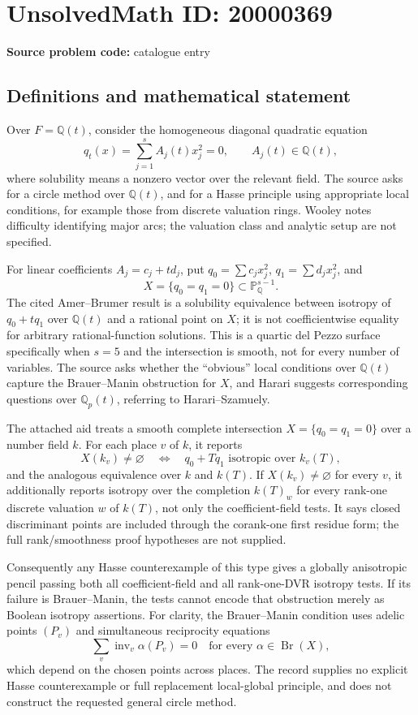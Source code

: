 \documentclass[11pt]{article}
\newcommand{\Q}{\mathbb{Q}}
\newcommand{\PP}{\mathbb{P}}
\begin{document}
\section*{UnsolvedMath ID: 20000369}
\textbf{Source problem code:} catalogue entry
\subsection{Definitions and mathematical statement}
Over \(F=\Q(t)\), consider the homogeneous diagonal quadratic equation
\[
q_t(x)=\sum_{j=1}^s A_j(t)x_j^2=0,\qquad A_j(t)\in\Q(t),
\]
where solubility means a nonzero vector over the relevant field. The source asks for a circle method over \(\Q(t)\), and for a Hasse principle using appropriate local conditions, for example those from discrete valuation rings. Wooley notes difficulty identifying major arcs; the valuation class and analytic setup are not specified.

For linear coefficients \(A_j=c_j+td_j\), put \(q_0=\sum c_jx_j^2\), \(q_1=\sum d_jx_j^2\), and
\[
X=\{q_0=q_1=0\}\subset\PP^{s-1}_{\Q}.
\]
The cited Amer--Brumer result is a solubility equivalence between isotropy of \(q_0+tq_1\) over \(\Q(t)\) and a rational point on \(X\); it is not coefficientwise equality for arbitrary rational-function solutions. This is a quartic del Pezzo surface specifically when \(s=5\) and the intersection is smooth, not for every number of variables. The source asks whether the ``obvious'' local conditions over \(\Q(t)\) capture the Brauer--Manin obstruction for \(X\), and Harari suggests corresponding questions over \(\Q_p(t)\), referring to Harari--Szamuely.

The attached aid treats a smooth complete intersection \(X=\{q_0=q_1=0\}\) over a number field \(k\). For each place \(v\) of \(k\), it reports
\[
X(k_v)\ne\varnothing\quad\Longleftrightarrow\quad
q_0+Tq_1\text{ isotropic over }k_v(T),
\]
and the analogous equivalence over \(k\) and \(k(T)\). If \(X(k_v)\ne\varnothing\) for every \(v\), it additionally reports isotropy over the completion \(k(T)_w\) for every rank-one discrete valuation \(w\) of \(k(T)\), not only the coefficient-field tests. It says closed discriminant points are included through the corank-one first residue form; the full rank/smoothness proof hypotheses are not supplied.

Consequently any Hasse counterexample of this type gives a globally anisotropic pencil passing both all coefficient-field and all rank-one-DVR isotropy tests. If its failure is Brauer--Manin, the tests cannot encode that obstruction merely as Boolean isotropy assertions. For clarity, the Brauer--Manin condition uses adelic points \((P_v)\) and simultaneous reciprocity equations
\[
\sum_v\operatorname{inv}_v\alpha(P_v)=0\quad\text{for every }\alpha\in\operatorname{Br}(X),
\]
which depend on the chosen points across places. The record supplies no explicit Hasse counterexample or full replacement local-global principle, and does not construct the requested general circle method.
\end{document}
